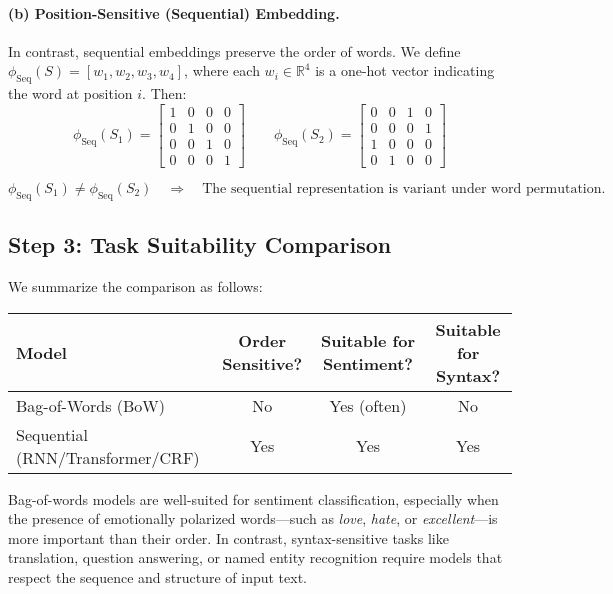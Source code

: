 \paragraph{(b) Position-Sensitive (Sequential) Embedding.}
In contrast, sequential embeddings preserve the order of words. We define $\phi_{\text{Seq}}(S) = [w_1, w_2, w_3, w_4]$, where each $w_i \in \mathbb{R}^4$ is a one-hot vector indicating the word at position $i$. Then:
\[
\phi_{\text{Seq}}(S_1) =
\begin{bmatrix}
	1 & 0 & 0 & 0 \\  %
	0 & 1 & 0 & 0 \\  %
	0 & 0 & 1 & 0 \\  %
	0 & 0 & 0 & 1     %
\end{bmatrix}
\qquad
\phi_{\text{Seq}}(S_2) =
\begin{bmatrix}
	0 & 0 & 1 & 0 \\  %
	0 & 0 & 0 & 1 \\  %
	1 & 0 & 0 & 0 \\  %
	0 & 1 & 0 & 0     %
\end{bmatrix}
\]

\begin{tcolorbox}[colback=gray!10, colframe=black, title=Conclusion]
	\[
	\phi_{\text{Seq}}(S_1) \ne \phi_{\text{Seq}}(S_2) \quad \Rightarrow \quad \text{The sequential representation is variant under word permutation.}
	\]
\end{tcolorbox}

\subsection*{Step 3: Task Suitability Comparison}

We summarize the comparison as follows:

\begin{center}
	\begin{tabular}{|l|c|c|c|}
		\hline
		\textbf{Model} & \textbf{Order Sensitive?} & \textbf{Suitable for Sentiment?} & \textbf{Suitable for Syntax?} \\
		\hline
		Bag-of-Words (BoW) & No & Yes (often) & No \\
		Sequential (RNN/Transformer/CRF) & Yes & Yes & Yes \\
		\hline
	\end{tabular}
\end{center}

Bag-of-words models are well-suited for sentiment classification, especially when the presence of emotionally polarized words—such as \textit{love}, \textit{hate}, or \textit{excellent}—is more important than their order. In contrast, syntax-sensitive tasks like translation, question answering, or named entity recognition require models that respect the sequence and structure of input text.


